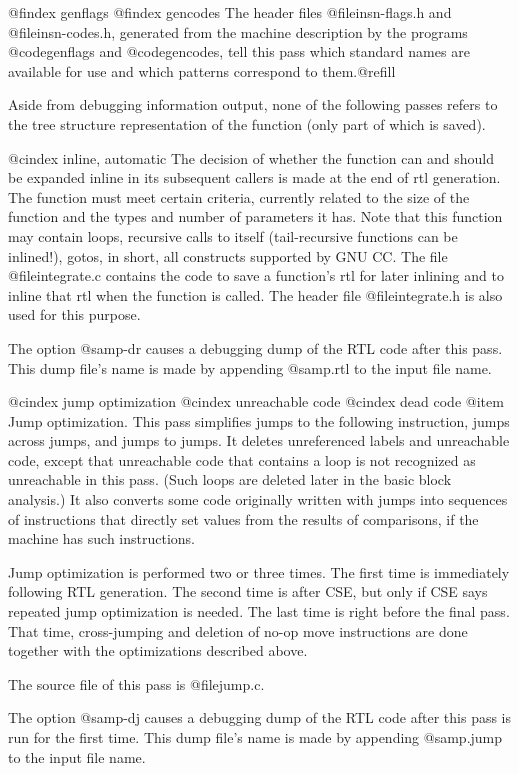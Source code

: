 @findex genflags
@findex gencodes
The header files @file{insn-flags.h} and @file{insn-codes.h},
generated from the machine description by the programs @code{genflags}
and @code{gencodes}, tell this pass which standard names are available
for use and which patterns correspond to them.@refill

Aside from debugging information output, none of the following passes
refers to the tree structure representation of the function (only
part of which is saved).

@cindex inline, automatic
The decision of whether the function can and should be expanded inline
in its subsequent callers is made at the end of rtl generation.  The
function must meet certain criteria, currently related to the size of
the function and the types and number of parameters it has.  Note that
this function may contain loops, recursive calls to itself
(tail-recursive functions can be inlined!), gotos, in short, all
constructs supported by GNU CC.  The file @file{integrate.c} contains
the code to save a function's rtl for later inlining and to inline that
rtl when the function is called.  The header file @file{integrate.h}
is also used for this purpose.

The option @samp{-dr} causes a debugging dump of the RTL code after
this pass.  This dump file's name is made by appending @samp{.rtl} to
the input file name.

@cindex jump optimization
@cindex unreachable code
@cindex dead code
@item
Jump optimization.  This pass simplifies jumps to the following
instruction, jumps across jumps, and jumps to jumps.  It deletes
unreferenced labels and unreachable code, except that unreachable code
that contains a loop is not recognized as unreachable in this pass.
(Such loops are deleted later in the basic block analysis.)  It also
converts some code originally written with jumps into sequences of
instructions that directly set values from the results of comparisons,
if the machine has such instructions.

Jump optimization is performed two or three times.  The first time is
immediately following RTL generation.  The second time is after CSE,
but only if CSE says repeated jump optimization is needed.  The
last time is right before the final pass.  That time, cross-jumping
and deletion of no-op move instructions are done together with the
optimizations described above.

The source file of this pass is @file{jump.c}.

The option @samp{-dj} causes a debugging dump of the RTL code after
this pass is run for the first time.  This dump file's name is made by
appending @samp{.jump} to the input file name.

